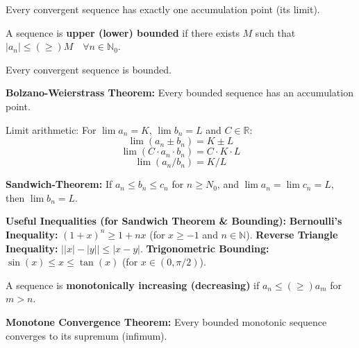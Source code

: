 \begin{theorem}
    Every convergent sequence has exactly one accumulation point (its limit).
\end{theorem}

\begin{definition}
    A sequence is \textbf{upper (lower) bounded} if there exists $M$ such that $|a_n| \le (\geq) M \quad \forall n \in \mathbb{N}_0$.
\end{definition}

\begin{theorem}
    Every convergent sequence is bounded.
\end{theorem}

\begin{theorem}
    \textbf{Bolzano-Weierstrass Theorem:} Every bounded sequence has an accumulation point.
\end{theorem}

\begin{theorem}
    Limit arithmetic: For $\lim a_n = K$, $\lim b_n = L$ and $C \in \mathbb{R}$:
    $$\lim (a_n \pm b_n) = K \pm L$$
    $$\lim (C \cdot a_n \cdot b_n) = C \cdot K \cdot L$$
    $$\lim (a_n / b_n) = K / L$$
\end{theorem}

\begin{theorem}
    \textbf{Sandwich-Theorem:} If $a_n \le b_n \le c_n$ for $n \ge N_0$, and $\lim a_n = \lim c_n = L$, then $\lim b_n = L$.
\end{theorem}

\begin{theorem}
    \textbf{Useful Inequalities (for Sandwich Theorem \& Bounding):}
    \textbf{Bernoulli's Inequality:} $(1+x)^n \ge 1+nx$ (for $x \ge -1$ and $n \in \mathbb{N}$).
    \textbf{Reverse Triangle Inequality:} $\big| |x| - |y| \big| \le |x-y|$.
    \textbf{Trigonometric Bounding:} $\sin(x) \le x \le \tan(x)$ (for $x \in (0, \pi/2)$).
\end{theorem}

\begin{definition}
    A sequence is \textbf{monotonically increasing (decreasing)} if $a_n \le (\geq) a_m$ for $m \gt n$.
\end{definition}

\begin{theorem}
    \textbf{Monotone Convergence Theorem:} Every bounded monotonic sequence converges to its supremum (infimum).
\end{theorem}

